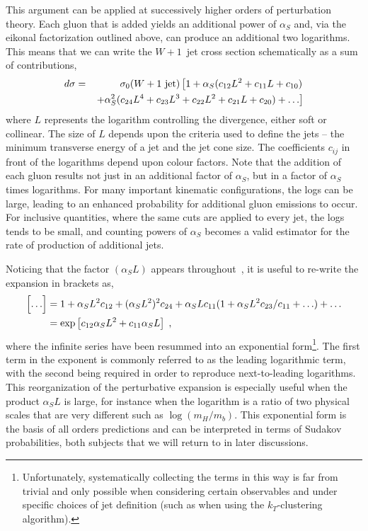 \documentclass[12pt]{iopart}
\def\as{\alpha_S}
\begin{document}
This argument can be applied at successively higher orders of perturbation theory.
Each gluon that is added yields an additional power of $\as$ and, via the eikonal
factorization outlined above, can produce an additional two logarithms. This means
that we can write the $W+1$~jet cross section schematically as a sum of contributions,
\begin{eqnarray}
\label{eq:w1jlogs}
d\sigma&=&\sigma_0(W+1~{\rm jet}) \left[
 1+\as(c_{12}L^2+c_{11}L+c_{10}) \right. \nonumber \\
&& \left. +\as^2(c_{24}L^4+c_{23}L^3+c_{22}L^2+c_{21}L+c_{20}) + \ldots \right]
\end{eqnarray}
where $L$ represents the logarithm controlling the divergence, either soft or collinear.  The size of
$L$ depends upon the criteria used to define the jets -- the minimum transverse energy of a jet and
the jet cone size. The coefficients $c_{ij}$ in front of the logarithms depend upon colour factors.
Note that the addition of each gluon results not just in an additional factor of 
$\as$, but  in a factor of $\as$ times logarithms. For many important kinematic
configurations, the logs can be large, leading to an enhanced probability for additional gluon
emissions to occur. For inclusive quantities, where the same cuts are applied to every jet, the logs
tends to be small, and counting powers of $\as$ becomes a valid estimator for the rate of
production of additional jets. 

\setcounter{footnote}{0}

Noticing that the factor $(\as L)$ appears throughout~, it is useful to
re-write the expansion in brackets as,
\begin{eqnarray}
\Bigl[ \ldots \Bigr] & =
 1+\as L^2c_{12}+(\as L^2)^2c_{24} 
 +\as Lc_{11}(1+\as L^2 c_{23}/c_{11} + \ldots) + \ldots \nonumber \\
 & = \exp \left[ c_{12} \as L^2 + c_{11} \as L \right] \; ,
\label{eq:w1resum}
\end{eqnarray}
where the infinite series have been resummed into an exponential form\footnote{
Unfortunately, systematically collecting the terms in this way is far from trivial and
only possible when considering certain observables and under specific choices of jet
definition (such as when using the $k_T$-clustering algorithm).}.
The first term in the exponent is commonly referred to as the leading logarithmic term,
with the second being required in order to reproduce next-to-leading logarithms.
This reorganization of the perturbative expansion is especially useful when the
product $\as L$ is large, for instance when the logarithm is a ratio of two
physical scales that are very different such as $\log(m_H/m_b)$. This exponential
form is the basis of all orders predictions and can be interpreted in terms of
Sudakov probabilities, both subjects that we will return to in later discussions.
\end{document}
